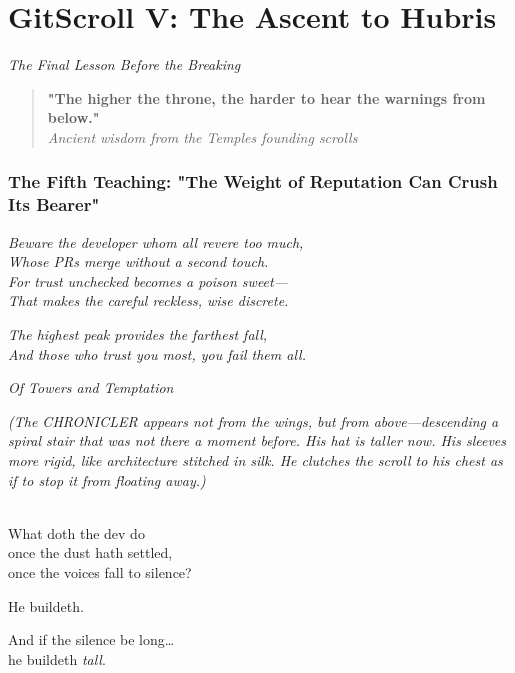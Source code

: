\chapter{GitScroll V: The Ascent to Hubris}
\label{chap:05-The-Ascent-to-Hubris}

\emph{The Final Lesson Before the Breaking}

\begin{quote}
\textbf{"The higher the throne, the harder to hear the warnings from below."}\\
\emph{Ancient wisdom from the Temple\textquotesingle s founding scrolls}
\end{quote}

\subsection{The Fifth Teaching: "The Weight of Reputation Can Crush Its Bearer"}\label{the-fifth-teaching-the-weight-of-reputation-can-crush-its-bearer}

\emph{Beware the developer whom all revere too much,}\\
\emph{Whose PRs merge without a second touch.}\\
\emph{For trust unchecked becomes a poison sweet---}\\
\emph{That makes the careful reckless, wise discrete.}

\emph{The highest peak provides the farthest fall,}\\
\emph{And those who trust you most, you fail them all.}

\bookdivider

\label{performing_arts-invocation-before-the-scroll}

\emph{Of Towers and Temptation}

\emph{(The CHRONICLER appears not from the wings, but from above---descending a spiral stair that was not there a moment before. His hat is taller now. His sleeves more rigid, like architecture stitched in silk. He clutches the scroll to his chest as if to stop it from floating away.)}

\\
What doth the dev do\\
once the dust hath settled,\\
once the voices fall to silence?

He buildeth.

And if the silence be long\ldots{}\\
he buildeth \emph{tall}.

